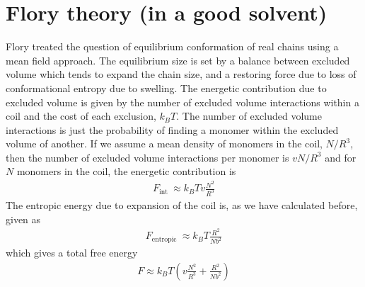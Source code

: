 \documentclass[letterpaper,10pt,english]{sphinxmanual}
\begin{document}
\section{Flory theory (in a good solvent)}
\label{\detokenize{notebooks/L22/1_real_polymers:Flory-theory-(in-a-good-solvent)}}
\sphinxAtStartPar
Flory treated the question of equilibrium conformation of real chains using a mean field approach. The equilibrium size is set by a balance between excluded volume which tends to expand the chain size, and a restoring force due to loss of conformational entropy due to swelling. The energetic contribution due to excluded volume is given by the number of excluded volume interactions within a coil and the cost of each exclusion, \(k_B T\). The number of excluded volume interactions is just the
probability of finding a monomer within the excluded volume of another. If we assume a mean density of monomers in the coil, \(N/R^3\), then the number of excluded volume interactions per monomer is \(vN/R^3\) and for \(N\) monomers in the coil, the energetic contribution is
\begin{equation*}
\begin{split}F_{\text {int }} \approx k_B T v \frac{N^{2}}{R^{3}}\end{split}
\end{equation*}
\sphinxAtStartPar
The entropic energy due to expansion of the coil is, as we have calculated before, given as
\begin{equation*}
\begin{split}F_{\text {entropic }} \approx k_B T \frac{R^{2}}{N b^{2}}\end{split}
\end{equation*}
\sphinxAtStartPar
which gives a total free energy
\begin{equation*}
\begin{split}F \approx k_B T\left(v \frac{N^{2}}{R^{3}}+\frac{R^{2}}{N b^{2}}\right)\end{split}
\end{equation*}
\sphinxAtStartPar
{}
\end{document}
